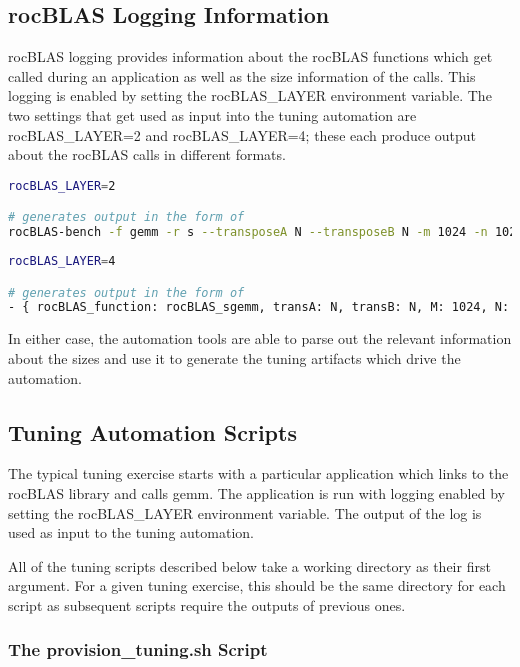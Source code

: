 \documentclass[]{article}
\begin{document}
\subsection{rocBLAS Logging Information}

rocBLAS logging provides information about the rocBLAS functions which get called during an application as well as the size information of the calls. This logging is enabled by setting the rocBLAS\_LAYER environment variable. The two settings that get used as input into the tuning automation are rocBLAS\_LAYER=2 and rocBLAS\_LAYER=4; these each produce output about the rocBLAS calls in different formats.

\begin{lstlisting}[language=bash,breaklines=true]
rocBLAS_LAYER=2

# generates output in the form of
rocBLAS-bench -f gemm -r s --transposeA N --transposeB N -m 1024 -n 1024 -k 1024 --beta 0.0 --alpha 1.0 --lda 1024 --ldb 1024 --ldc 1024
\end{lstlisting}

\begin{lstlisting}[language=bash,breaklines=true]
rocBLAS_LAYER=4

# generates output in the form of
- { rocBLAS_function: rocBLAS_sgemm, transA: N, transB: N, M: 1024, N: 1024, K: 1024, lda: 1024, ldb: 1024, ldc: 1024}
\end{lstlisting}

\noindent
In either case, the automation tools are able to parse out the relevant information about the sizes and use it to generate the tuning artifacts which drive the automation.

\subsection{Tuning Automation Scripts}

The typical tuning exercise starts with a particular application which links to the rocBLAS library and calls gemm. The application is run with logging enabled by setting the rocBLAS\_LAYER environment variable. The output of the log is used as input to the tuning automation.

All of the tuning scripts described below take a working directory as their first argument. For a given tuning exercise, this should be the same directory for each script as subsequent scripts require the outputs of previous ones.

\subsubsection{The provision\_tuning.sh Script}
\end{document}
